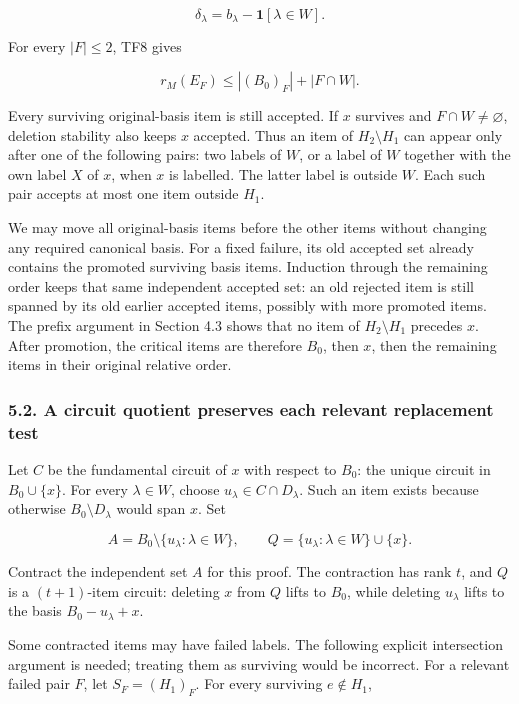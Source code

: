 \[
\delta_\lambda=b_\lambda-\mathbf1[\lambda\in W].
\]

For every \(|F|\le2\), TF8 gives

\[
r_M(E_F)\le |(B_0)_F|+|F\cap W|.
\]

Every surviving original-basis item is still accepted. If \(x\) survives and \(F\cap W\ne\varnothing\), deletion stability also keeps \(x\) accepted. Thus an item of \(H_2\setminus H_1\) can appear only after one of the following pairs: two labels of \(W\), or a label of \(W\) together with the own label \(X\) of \(x\), when \(x\) is labelled. The latter label is outside \(W\). Each such pair accepts at most one item outside \(H_1\).

We may move all original-basis items before the other items without changing any required canonical basis. For a fixed failure, its old accepted set already contains the promoted surviving basis items. Induction through the remaining order keeps that same independent accepted set: an old rejected item is still spanned by its old earlier accepted items, possibly with more promoted items. The prefix argument in Section 4.3 shows that no item of \(H_2\setminus H_1\) precedes \(x\). After promotion, the critical items are therefore \(B_0\), then \(x\), then the remaining items in their original relative order.

\hypertarget{af-0a3ce40617-a-circuit-quotient-preserves-each-relevant-replacement-test}{%
\subsubsection{5.2. A circuit quotient preserves each relevant replacement test}\label{af-0a3ce40617-a-circuit-quotient-preserves-each-relevant-replacement-test}}

Let \(C\) be the fundamental circuit of \(x\) with respect to \(B_0\): the unique circuit in \(B_0\cup\{x\}\). For every \(\lambda\in W\), choose \(u_\lambda\in C\cap D_\lambda\). Such an item exists because otherwise \(B_0\setminus D_\lambda\) would span \(x\). Set

\[
A=B_0\setminus\{u_\lambda:\lambda\in W\},
\qquad
Q=\{u_\lambda:\lambda\in W\}\cup\{x\}.
\]

Contract the independent set \(A\) for this proof. The contraction has rank \(t\), and \(Q\) is a \((t+1)\)-item circuit: deleting \(x\) from \(Q\) lifts to \(B_0\), while deleting \(u_\lambda\) lifts to the basis \(B_0-u_\lambda+x\).

Some contracted items may have failed labels. The following explicit intersection argument is needed; treating them as surviving would be incorrect. For a relevant failed pair \(F\), let \(S_F=(H_1)_F\). For every surviving \(e\notin H_1\),

